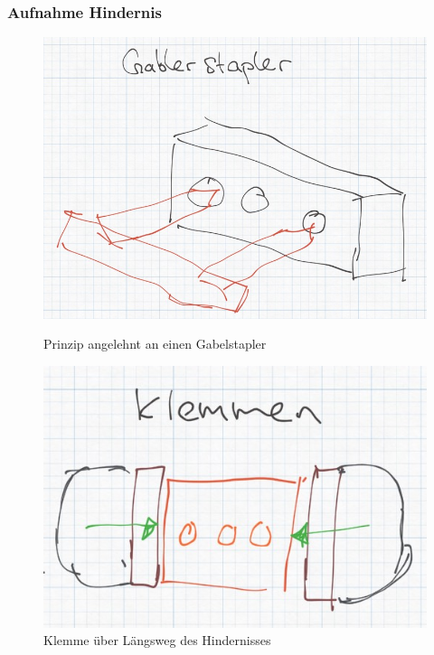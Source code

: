 \subsubsection{Aufnahme Hindernis}
\begin{figure}[h!]
    \centering
    \begin{minipage}{0.45\textwidth}
        \centering
        \includegraphics[width=\textwidth]{img/technologierecherche/Aufnahme/Gabelstapler.jpg}
        \caption{Prinzip angelehnt an einen Gabelstapler}
        \label{img:tech_Gaplerstapler}
    \end{minipage}
    \hfill
    \begin{minipage}{0.45\textwidth}
        \centering
        \includegraphics[width=\textwidth]{img/technologierecherche/Aufnahme/Laengsweg_Griff.jpg}
        \caption{Klemme über Längsweg des Hindernisses}
        \label{img:tech_Laengsweg_Griff}
    \end{minipage}
\end{figure}
